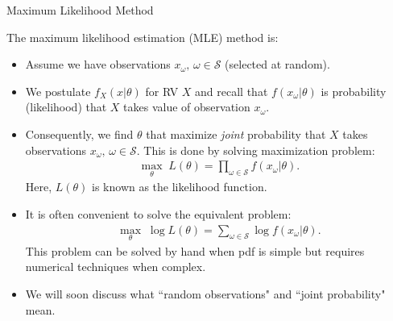 \documentclass[handout,9pt]{beamer}
\begin{document}
%
\begin{frame}{Maximum Likelihood Method}

The maximum likelihood estimation (MLE) method is:

\begin{itemize}
\item Assume we have observations $x_\omega,\, \omega \in \mathcal{S}$ (selected at random).
\item We postulate $f_X(x|\theta)$ for RV $X$ and recall that $f(x_\omega|\theta)$ is probability (likelihood) that $X$ takes  value of observation $x_\omega$.  

\item Consequently, we find $\theta$ that maximize {\em joint} probability that $X$ takes observations $x_\omega,\,\omega \in \mathcal{S}$. This is done by solving maximization problem:
\begin{align*}
\max_\theta\; L(\theta)=\prod_{\omega \in \mathcal{S}}f(x_\omega|\theta).
\end{align*}
Here, $L(\theta)$ is known as the likelihood function. 

\item It is often convenient to solve the equivalent problem:
\begin{align*}
\max_\theta\; \log L(\theta)=\sum_{\omega \in \mathcal{S}}\log f(x_\omega|\theta).
\end{align*}
This problem can be solved by hand when pdf is simple but requires numerical techniques when complex. 
\item We will soon discuss what ``random observations" and ``joint probability" mean. 
\end{itemize}

\end{frame}
\end{document}
